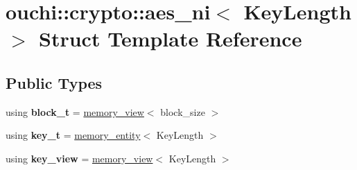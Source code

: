 \hypertarget{structouchi_1_1crypto_1_1aes__ni}{}\section{ouchi\+::crypto\+::aes\+\_\+ni$<$ Key\+Length $>$ Struct Template Reference}
\label{structouchi_1_1crypto_1_1aes__ni}
\subsection*{Public Types}
\begin{DoxyCompactItemize}
\item 
\mbox{\label{structouchi_1_1crypto_1_1aes__ni_a844bba4098279f9a2f6733fa13c49b53}} 
using {\bfseries block\+\_\+t} = \mbox{\hyperlink{classouchi_1_1crypto_1_1memory__view}{memory\+\_\+view}}$<$ block\+\_\+size $>$
\item 
\mbox{\label{structouchi_1_1crypto_1_1aes__ni_ae5a6eeeb0453c0db907a584558c2d022}} 
using {\bfseries key\+\_\+t} = \mbox{\hyperlink{structouchi_1_1crypto_1_1memory__entity}{memory\+\_\+entity}}$<$ Key\+Length $>$
\item 
\mbox{\label{structouchi_1_1crypto_1_1aes__ni_aff964da96986400b64b6e1438b7199d3}} 
using {\bfseries key\+\_\+view} = \mbox{\hyperlink{classouchi_1_1crypto_1_1memory__view}{memory\+\_\+view}}$<$ Key\+Length $>$
\end{DoxyCompactItemize}
